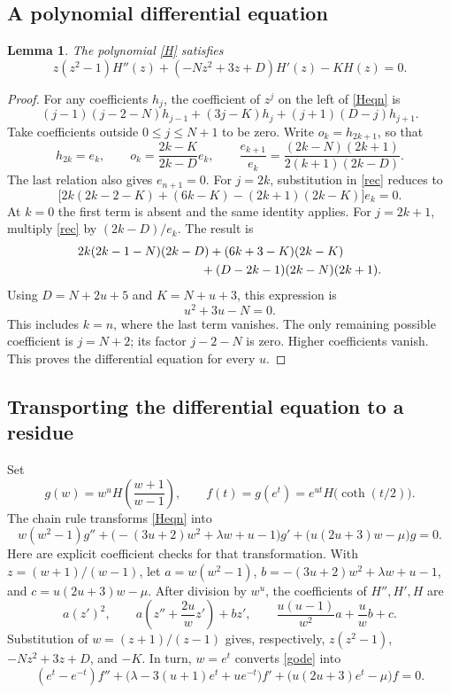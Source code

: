 \documentclass[11pt]{article}
\newtheorem{lemma}{Lemma}
\begin{document}
\subsection*{A polynomial differential equation}
\begin{lemma}\label{odeH}
The polynomial \eqref{H} satisfies
\begin{equation}\label{Heqn}
 z(z^2-1)H''(z)+(-Nz^2+3z+D)H'(z)-KH(z)=0.
\end{equation}
\end{lemma}
\begin{proof}
For any coefficients \(h_j\), the coefficient of \(z^j\) on the
left of \eqref{Heqn} is
\begin{equation}\label{rec}
 (j-1)(j-2-N)h_{j-1}+(3j-K)h_j
                       +(j+1)(D-j)h_{j+1}.
\end{equation}
Take coefficients outside \(0\le j\le N+1\) to be zero.
Write \(o_k=h_{2k+1}\), so that
\[
 h_{2k}=e_k,\qquad o_k=\frac{2k-K}{2k-D}e_k,\qquad
 \frac{e_{k+1}}{e_k}
 =\frac{(2k-N)(2k+1)}{2(k+1)(2k-D)}.
\]
The last relation also gives \(e_{n+1}=0\).
For \(j=2k\), substitution in \eqref{rec} reduces to
\[
 \bigl[2k(2k-2-K)+(6k-K)-(2k+1)(2k-K)\bigr]e_k=0.
\]
At \(k=0\) the first term is absent and the same identity applies.
For \(j=2k+1\), multiply \eqref{rec} by \((2k-D)/e_k\).
The result is
\begin{align*}
 &2k(2k-1-N)(2k-D)+(6k+3-K)(2k-K)\\
 &\hspace{35mm}+(D-2k-1)(2k-N)(2k+1).
\end{align*}
Using \(D=N+2u+5\) and \(K=N+u+3\), this expression is
\[
 u^2+3u-N=0.
\]
This includes \(k=n\), where the last term vanishes.
The only remaining possible coefficient is \(j=N+2\);
its factor \(j-2-N\) is zero. Higher coefficients vanish.
This proves the differential equation for every \(u\).
\end{proof}

\subsection*{Transporting the differential equation to a residue}
Set
\[
 g(w)=w^u H\!\left(\frac{w+1}{w-1}\right),
 \qquad f(t)=g(e^t)=e^{ut}H\bigl(\coth(t/2)\bigr).
\]
The chain rule transforms \eqref{Heqn} into
\begin{equation}\label{gode}
 w(w^2-1)g''+
 \bigl(-(3u+2)w^2+\lambda w+u-1\bigr)g'
 +\bigl(u(2u+3)w-\mu\bigr)g=0.
\end{equation}
Here are explicit coefficient checks for that transformation.
With \(z=(w+1)/(w-1)\), let \(a=w(w^2-1)\),
\(b=-(3u+2)w^2+\lambda w+u-1\), and
\(c=u(2u+3)w-\mu\).
After division by \(w^u\), the coefficients of \(H'',H',H\) are
\[
 a(z')^2,\qquad a\left(z''+\frac{2u}{w}z'\right)+bz',
 \qquad \frac{u(u-1)}{w^2}a+\frac{u}{w}b+c.
\]
Substitution of \(w=(z+1)/(z-1)\) gives, respectively,
\(z(z^2-1)\), \(-Nz^2+3z+D\), and \(-K\).
In turn, \(w=e^t\) converts \eqref{gode} into
\begin{equation}\label{fode}
 (e^t-e^{-t})f''+
 \bigl(\lambda-3(u+1)e^t+u e^{-t}\bigr)f'
 +\bigl(u(2u+3)e^t-\mu\bigr)f=0.
\end{equation}
\end{document}
